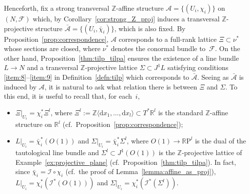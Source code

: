 \documentclass[10pt,a4paper]{amsart}
\numberwithin{equation}{section}
\newcommand{\de}{\mathrm{d}} %
\newcommand{\RR}{\mathbb{R}}
\newcommand{\ZZ}{\mathbb{Z}}
\begin{document}
Henceforth, f\/ix a strong transversal $\ZZ$-af\/f\/ine structure $\mathcal{A}=\{(U_i,\chi_i)\}$ on $(N,\mathcal{F})$ which, by Corollary~\ref{cor:strong_Z_proj} induces a transversal $\ZZ$-projective structure $\bar{\mathcal{A}} = \{(U_i,\bar{\chi}_i)\}$, which is also f\/ixed. By Proposition~\ref{prop:correspondence}, $\mathcal{A}$ corresponds to a full-rank lattice $\Xi \subset \nu^*$ whose sections are closed, where $\nu^*$ denotes the conormal bundle to~$\mathcal{F}$. On the other hand, Proposition~\ref{thm:tilp_tilpa} ensures the existence of a line bundle $L \to N$ and a transversal
$\ZZ$-projective lattice $\Sigma \subset J^1L$ satisfying conditions \ref{item:8}--\ref{item:9} in Def\/inition~\ref{defn:tilp} which corresponds to $\bar{\mathcal{A}}$. Seeing as $\bar{\mathcal{A}}$ is induced by $\mathcal{A}$, it is natural to ask what relation there is between $\Xi$ and $\Sigma$. To this end, it is useful to recall that, for each~$i$,
\begin{itemize}\itemsep=0pt
\item $\Xi|_{U_i}= \chi_i^* \Xi^l$, where $\Xi^l:=\ZZ \langle \de x_1,\ldots , \de x_l \rangle \subset T^* \RR^l$ is the standard $\ZZ$-af\/f\/ine structure on $\RR^l$ (cf.\ Proposition~\ref{prop:correspondence});
\item $L|_{U_i} = \bar{\chi}_i^*(O(1))$ and $\Sigma|_{U_i} = \bar{\chi}_i^* \Sigma^l$, where $O(1) \to \RR\mathrm{P}^l$ is the dual of the tautological line bundle and $\Sigma^l \subset J^1(O(1))$ is the $\ZZ$-projective lattice of Example~\ref{ex:projective_plane} (cf.\ Proposition~\ref{thm:tilp_tilpa}). In fact, since $\bar{\chi}_i = \mathcal{I} \circ \chi_i$ (cf.\ the proof of Lemma~\ref{lemma:affine_as_proj}), $L|_{U_i} = \chi^*_i(\mathcal{I}^*(O(1)))$ and $\Sigma|_{U_i} = \chi^*_i(\mathcal{I}^*(\Sigma^l))$.
\end{itemize}
\end{document}
